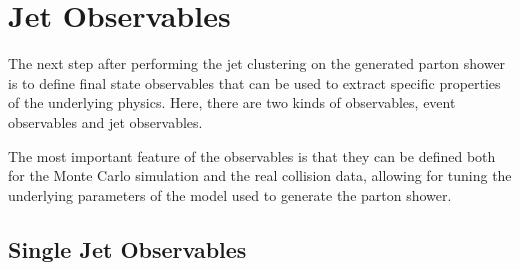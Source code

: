 \chapter{Jet Observables}

The next step after performing the jet clustering on the generated parton shower is to define final state observables that can be used to extract specific properties of the underlying physics. Here, there are two kinds of observables, event observables and jet observables.  

The most important feature of the observables is that they can be defined both for the Monte Carlo simulation and the real collision data, allowing for tuning the underlying parameters of the model used to generate the parton shower. 
\section{Single Jet Observables}



